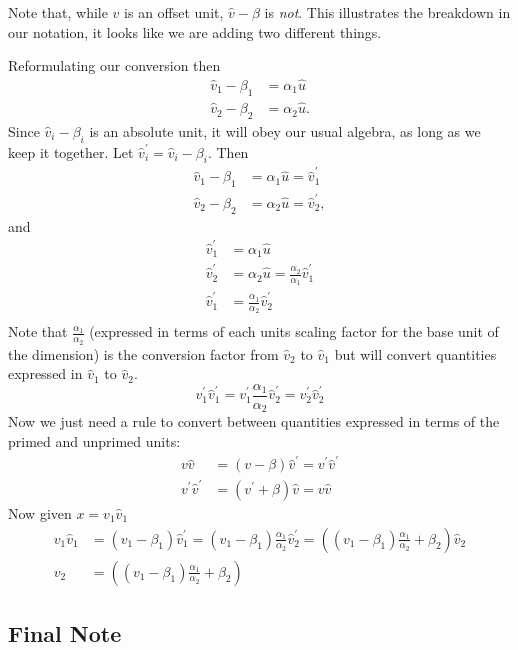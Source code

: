 \documentclass[letterpaper,10pt]{article}
\begin{document}
Note that, while $\hat{v}$ is an offset unit, $\hat{v}-\beta$ is \emph{not}. This
illustrates the breakdown in our notation, it looks like we are adding two different things.

Reformulating our conversion then
\begin{align}
  \hat{v}_1  - \beta_1 &= \alpha_1 \hat{u} \\
  \hat{v}_2  - \beta_2 &= \alpha_2 \hat{u}.
\end{align}
Since $\hat{v}_i  - \beta_i$ is an absolute unit, it will obey our usual algebra, as long as we keep it together. Let $\hat{v}^\prime_i = \hat{v}_i - \beta_i$. Then
\begin{align}
  \hat{v}_1  - \beta_1 &= \alpha_1 \hat{u} = \hat{v}^\prime_1 \\
  \hat{v}_2  - \beta_2 &= \alpha_2 \hat{u} = \hat{v}^\prime_2 ,
\end{align}
and
\begin{align}
  \hat{v}^\prime_1 &= \alpha_1 \hat{u} \\
  \hat{v}^\prime_2 &= \alpha_2 \hat{u} = \frac{\alpha_2}{\alpha_1} \hat{v}^\prime_1 \\
  \hat{v}^\prime_1 &= \frac{\alpha_1}{\alpha_2} \hat{v}^\prime_2 \\
\end{align}
Note that $\frac{\alpha_1}{\alpha_2}$ (expressed in terms of each units scaling factor for the base unit of the dimension)
is the conversion factor from $\hat{v}_2$ to $\hat{v}_1$ but will convert quantities expressed
in $\hat{v}_1$ to $\hat{v}_2$.
$$
v^\prime_1 \hat{v}^\prime_1 = v^\prime_1 \frac{\alpha_1}{\alpha_2} \hat{v}^\prime_2 = v^\prime_2 \hat{v}^\prime_2
$$
Now we just need a rule to convert between quantities expressed in terms of the primed and unprimed units:
\begin{align}
  v \hat{v} &= (v - \beta)\hat{v}^\prime = v^\prime \hat{v}^\prime \\
  v^\prime \hat{v}^\prime &= (v^\prime + \beta)\hat{v} = v\hat{v}
\end{align}
Now given $x = v_1\hat{v}_1$
\begin{align}
  v_1 \hat{v}_1 &= (v_1 - \beta_1) \hat{v}^\prime_1 = (v_1 - \beta_1) \frac{\alpha_1}{\alpha_2} \hat{v}^\prime_2 = \left((v_1 - \beta_1) \frac{\alpha_1}{\alpha_2} + \beta_2\right) \hat{v}_2 \\
  v_2 &= \left((v_1 - \beta_1) \frac{\alpha_1}{\alpha_2} + \beta_2\right)
\end{align}

\subsection{Final Note}
\end{document}
